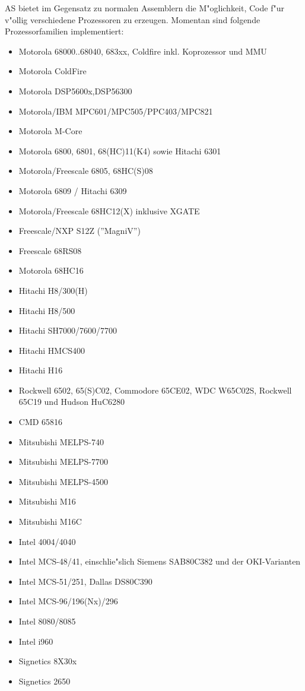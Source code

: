 \documentclass[12pt,a4paper,twoside]{report}
\begin{document}
AS bietet im Gegensatz zu normalen Assemblern die M"oglichkeit, Code
f"ur v"ollig verschiedene Prozessoren zu erzeugen.  Momentan sind
folgende Prozessorfamilien implementiert:
\begin{itemize}
\item{Motorola 68000..68040, 683xx, Coldfire inkl. Koprozessor und MMU}
\item{Motorola ColdFire}
\item{Motorola DSP5600x,DSP56300}
\item{Motorola/IBM MPC601/MPC505/PPC403/MPC821}
\item{Motorola M-Core}
\item{Motorola 6800, 6801, 68(HC)11(K4) sowie Hitachi 6301}
\item{Motorola/Freescale 6805, 68HC(S)08}
\item{Motorola 6809 / Hitachi 6309}
\item{Motorola/Freescale 68HC12(X) inklusive XGATE}
\item{Freescale/NXP S12Z (''MagniV'')}
\item{Freescale 68RS08}
\item{Motorola 68HC16}
\item{Hitachi H8/300(H)}
\item{Hitachi H8/500}
\item{Hitachi SH7000/7600/7700}
\item{Hitachi HMCS400}
\item{Hitachi H16}
\item{Rockwell 6502, 65(S)C02, Commodore 65CE02, WDC W65C02S, Rockwell 65C19 und
      Hudson HuC6280}
\item{CMD 65816}
\item{Mitsubishi MELPS-740}
\item{Mitsubishi MELPS-7700}
\item{Mitsubishi MELPS-4500}
\item{Mitsubishi M16}
\item{Mitsubishi M16C}
\item{Intel 4004/4040}
\item{Intel MCS-48/41, einschlie"slich Siemens SAB80C382 und der
      OKI-Varianten}
\item{Intel MCS-51/251, Dallas DS80C390}
\item{Intel MCS-96/196(Nx)/296}
\item{Intel 8080/8085}
\item{Intel i960}
\item{Signetics 8X30x}
\item{Signetics 2650}

\end{itemize}
\end{document}
